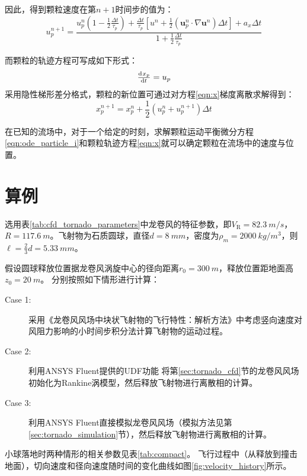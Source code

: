 \documentclass{ctexart}
\begin{document}
因此，得到颗粒速度在第$n+1$时间步的值为：
\begin{equation}
u_{p}^{n+1}=\frac{u_{p}^{n}\left(   1- \frac{1}{2}\frac{\Delta t}{\tau_p} \right)+\frac{\Delta t}{\tau_p}\left[    u^n + \frac{1}{2} \left( \bm{u}_p^n\cdot \nabla \bm{u}^n \right) \Delta t    \right]+a_x \Delta t}{1+\frac{1}{2}\frac{\Delta t}{\tau_p}}
\end{equation}

而颗粒的轨迹方程可写成如下形式：
\begin{equation}\label{eqn:x}
\od{x_p}{t} = u_p
\end{equation}
采用隐性梯形差分格式，颗粒的新位置可通过对方程\eqref{eqn:x}梯度离散求解得到：
\begin{equation}
x_p^{n+1} = x_{p}^{n} + \frac{1}{2} \left( u_p^{n}+u_{p}^{n+1}\right) \Delta t 
\end{equation}

在已知的流场中，对于一个给定的时刻，求解颗粒运动平衡微分方程\eqref{eqn:ode_particle_i}和颗粒轨迹方程\eqref{eqn:x}就可以确定颗粒在流场中的速度与位置。

\section{算例}
选用表\ref{tab:cfd_tornado_parameters}中龙卷风的特征参数，即$V_{\mathrm{R}}=\SI{82.3}{m/s}$，$R = \SI{117.6}{m}$。飞射物为石质圆球，直径$d=\SI{8}{mm}$，密度为$\rho_m=\SI{2000}{kg/m^3}$，则$\ell =\frac{2}{3}d=\SI{5.33}{mm}$。

假设圆球释放位置据龙卷风涡旋中心的径向距离$r_0=\SI{300}{m}$，释放位置距地面高$z_0=\SI{20}{m}$。
分别按照如下情形进行计算：
\begin{description}
\item[Case 1: ] 采用《龙卷风风场中块状飞射物的飞行特性：解析方法》中考虑竖向速度对风阻力影响的小时间步积分法计算飞射物的运动过程。
\item[Case 2: ] 
利用ANSYS Fluent\textregistered 提供的UDF功能 将第\ref{sec:tornado_cfd}节的龙卷风风场初始化为Rankine涡模型，然后释放飞射物进行离散相的计算。
\item[Case 3: ] 
利用ANSYS Fluent\textregistered 直接模拟龙卷风风场（模拟方法见第\ref{sec:tornado_simulation}节），然后释放飞射物进行离散相的计算。
\end{description}

小球落地时两种情形的相关参数见表\ref{tab:compact}。
飞行过程中（从释放到撞击地面），切向速度和径向速度随时间的变化曲线如图\ref{fig:velocity_history}所示。
\end{document}
